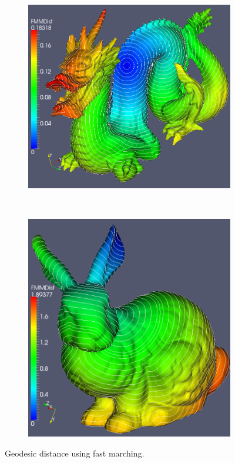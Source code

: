 \documentclass{InsightArticle}
\begin{document}
\begin{figure}
  \centering
  \begin{subfigure}[b]{0.5\textwidth}
    \centering
    \includegraphics[width=\textwidth]{DragonGeodesic}
    \label{fig:DragonGeodesic}
  \end{subfigure}%
  ~ %
  \begin{subfigure}[b]{0.45\textwidth}
    \centering
    \includegraphics[width=\textwidth]{BunnyGeodesic}
    \label{fig:BunnyGeodesic}
  \end{subfigure}
\caption{Geodesic distance using fast marching.}
\label{fig:GeodesicDistances}
\end{figure}
\end{document}
